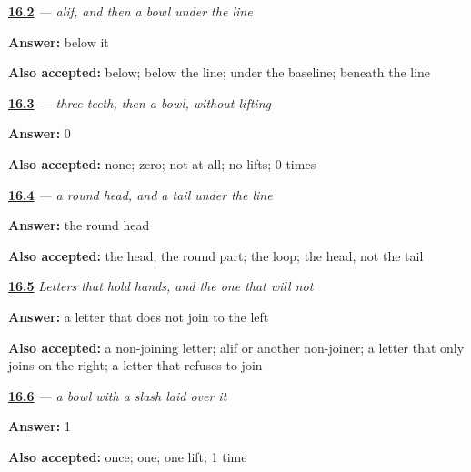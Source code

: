 \noindent\begin{minipage}[t]{\linewidth}
\raggedright
\hyperlink{review-UR-W16-lam-bowl}{\textbf{16.2}} \emph{ — alif, and then a bowl under the line}\par
\small \textbf{Answer:} below it\par
\footnotesize \textbf{Also accepted:} below; below the line; under the baseline; beneath the line
\end{minipage}\par\medskip

\noindent\begin{minipage}[t]{\linewidth}
\raggedright
\hyperlink{review-UR-W16-sin-lifts}{\textbf{16.3}} \emph{ — three teeth, then a bowl, without lifting}\par
\small \textbf{Answer:} 0\par
\footnotesize \textbf{Also accepted:} none; zero; not at all; no lifts; 0 times
\end{minipage}\par\medskip

\noindent\begin{minipage}[t]{\linewidth}
\raggedright
\hyperlink{review-UR-W16-mim-head}{\textbf{16.4}} \emph{ — a round head, and a tail under the line}\par
\small \textbf{Answer:} the round head\par
\footnotesize \textbf{Also accepted:} the head; the round part; the loop; the head, not the tail
\end{minipage}\par\medskip

\noindent\begin{minipage}[t]{\linewidth}
\raggedright
\hyperlink{review-UR-W16-joining-gap}{\textbf{16.5}} \emph{Letters that hold hands, and the one that will not}\par
\small \textbf{Answer:} a letter that does not join to the left\par
\footnotesize \textbf{Also accepted:} a non-joining letter; alif or another non-joiner; a letter that only joins on the right; a letter that refuses to join
\end{minipage}\par\medskip

\noindent\begin{minipage}[t]{\linewidth}
\raggedright
\hyperlink{review-UR-W16-kaf-lifts}{\textbf{16.6}} \emph{ — a bowl with a slash laid over it}\par
\small \textbf{Answer:} 1\par
\footnotesize \textbf{Also accepted:} once; one; one lift; 1 time
\end{minipage}\par\medskip

